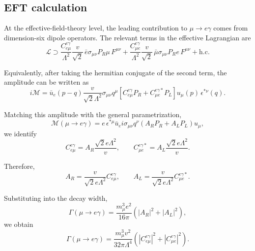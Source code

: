 \documentclass[11pt]{article}
\begin{document}
\subsection*{EFT calculation}

At the effective-field-theory level, the leading contribution to $\mu \to e\gamma$ comes from dimension-six dipole operators. The relevant terms in the effective Lagrangian are
\begin{equation}
    \mathcal{L}
    \supset
    \frac{C^{e\gamma}_{e\mu}}{\Lambda^2}
    \frac{v}{\sqrt{2}}\,
    \bar{e}\sigma_{\mu\nu}P_R\mu\,F^{\mu\nu}
    +
    \frac{C^{e\gamma}_{\mu e}}{\Lambda^2}
    \frac{v}{\sqrt{2}}\,
    \bar{\mu}\sigma_{\mu\nu}P_R e\,F^{\mu\nu}
    + \text{h.c.}
\end{equation}

Equivalently, after taking the hermitian conjugate of the second term, the amplitude can be written as
\begin{equation}
    i\mathcal{M}
    =
    \bar{u}_e(p-q)
    \frac{v}{\sqrt{2}\Lambda^2}
    \sigma_{\mu\nu}q^\mu
    \left[
        C^{e\gamma}_{e\mu}P_R
        +
        C^{e\gamma *}_{\mu e}P_L
    \right]
    u_\mu(p)\,
    \epsilon^{*\nu}(q).
\end{equation}

Matching this amplitude with the general parametrization,
\begin{equation}
    \mathcal{M}(\mu \to e\gamma)
    =
    e\,\epsilon^{*\mu}
    \bar{u}_e i\sigma_{\mu\nu}q^\nu
    \left(
        A_RP_R+A_LP_L
    \right)
    u_\mu,
\end{equation}
we identify
\begin{equation}
    C^{e\gamma}_{e\mu}
    =
    A_R \frac{\sqrt{2}e\Lambda^2}{v},
    \qquad
    C^{e\gamma *}_{\mu e}
    =
    A_L \frac{\sqrt{2}e\Lambda^2}{v}.
\end{equation}

Therefore,
\begin{equation}
    A_R =
    \frac{v}{\sqrt{2}e\Lambda^2}
    C^{e\gamma}_{e\mu},
    \qquad
    A_L =
    \frac{v}{\sqrt{2}e\Lambda^2}
    C^{e\gamma *}_{\mu e}.
\end{equation}

Substituting into the decay width,
\begin{equation}
    \Gamma(\mu \to e\gamma)
    =
    \frac{m_\mu^3 e^2}{16\pi}
    \left(
        |A_R|^2+|A_L|^2
    \right),
\end{equation}
we obtain
\begin{equation}
    \Gamma(\mu \to e\gamma)
    =
    \frac{m_\mu^3 v^2}{32\pi\Lambda^4}
    \left(
        |C^{e\gamma}_{e\mu}|^2
        +
        |C^{e\gamma}_{\mu e}|^2
    \right).
\end{equation}
\end{document}
